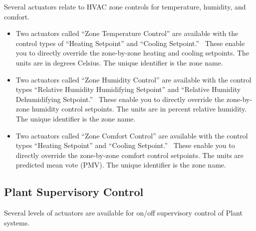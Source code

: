 Several actuators relate to HVAC zone controls for temperature, humidity, and comfort.

\begin{itemize}
\item
  Two actuators called ``Zone Temperature Control'' are available with the control types of ``Heating Setpoint'' and ``Cooling Setpoint.''~ These enable you to directly override the zone-by-zone heating and cooling setpoints. The units are in degrees Celsius. The unique identifier is the zone name.
\item
  Two actuators called ``Zone Humidity Control'' are available with the control types ``Relative Humidity Humidifying Setpoint'' and ``Relative Humidity Dehumidifying Setpoint.'' ~These enable you to directly override the zone-by-zone humidity control setpoints. The units are in percent relative humidity. The unique identifier is the zone name.
\item
  Two actuators called ``Zone Comfort Control'' are available with the control types ``Heating Setpoint'' and ``Cooling Setpoint.''~ These enable you to directly override the zone-by-zone comfort control setpoints. The units are predicted mean vote (PMV). The unique identifier is the zone name.
\end{itemize}

\subsection{Plant Supervisory Control}\label{plant-supervisory-control}

Several levels of actuators are available for on/off supervisory control of Plant systems.

